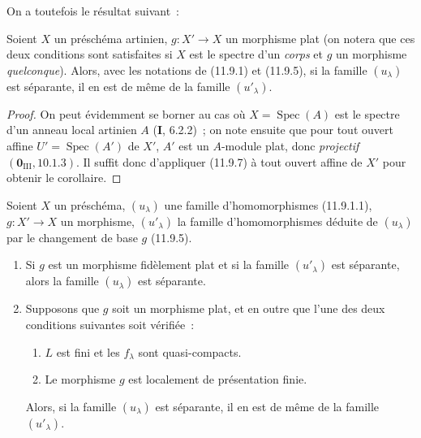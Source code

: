 On a toutefois le résultat suivant~:

\begin{corollary}[11.9.9]
\label{IV.11.9.9-fr}
Soient $X$ un préschéma artinien, $g:X'\to X$ un morphisme plat (on notera que
ces deux conditions sont satisfaites si $X$ est le spectre d'un \emph{corps}
et $g$ un morphisme \emph{quelconque}). Alors, avec les notations de (11.9.1)
et (11.9.5), si la famille $(u_\lambda)$ est séparante, il en est de même de la
famille $(u'_\lambda)$.
\end{corollary}

\begin{proof}
On peut évidemment se borner au cas où $X=\operatorname{Spec}(A)$ est le
spectre d'un anneau local artinien $A$ (\textbf I, 6.2.2)~; on note ensuite que
pour tout ouvert affine $U'=\operatorname{Spec}(A')$ de $X'$, $A'$ est un
$A$-module plat, donc \emph{projectif} $(\mathbf 0_{\mathrm{III}},10.1.3)$.
Il suffit donc d'appliquer (11.9.7) à tout ouvert affine de $X'$ pour obtenir
le corollaire.
\end{proof}

\begin{theorem}[11.9.10]
\label{IV.11.9.10-fr}
Soient $X$ un préschéma, $(u_\lambda)$ une famille d'homomorphismes
(11.9.1.1), $g:X'\to X$ un morphisme, $(u'_\lambda)$ la famille
d'homomorphismes déduite de $(u_\lambda)$ par le changement de base $g$
(11.9.5).
\begin{enumerate}[label=(\roman*)]
  \item Si $g$ est un morphisme fidèlement plat et si la famille
  $(u'_\lambda)$ est séparante, alors la famille $(u_\lambda)$ est séparante.
  \item Supposons que $g$ soit un morphisme plat, et en outre que l'une des
  deux conditions suivantes soit vérifiée~:
  \begin{enumerate}[label=\emph{\alph*)}]
    \item $L$ est fini et les $f_\lambda$ sont quasi-compacts.
    \item Le morphisme $g$ est localement de présentation finie.
  \end{enumerate}
  Alors, si la famille $(u_\lambda)$ est séparante, il en est de même de la
  famille $(u'_\lambda)$.
\end{enumerate}
\end{theorem}

